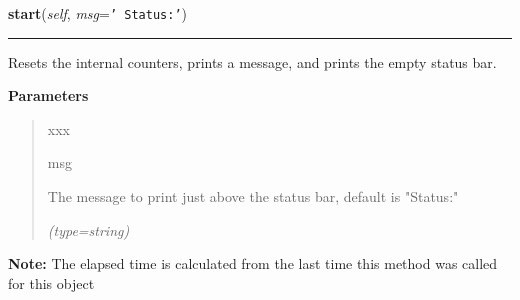     \label{morpher:misc:section_reporter:SectionReporter:start}

    \vspace{0.5ex}

\hspace{.8\funcindent}\begin{boxedminipage}{\funcwidth}

    \raggedright \textbf{start}(\textit{self}, \textit{msg}={\tt \texttt{'}\texttt{  Status:}\texttt{'}})

    \vspace{-1.5ex}

    \rule{\textwidth}{0.5\fboxrule}
\setlength{\parskip}{2ex}
    Resets the internal counters, prints a message, and prints the empty 
    status bar.

\setlength{\parskip}{1ex}
      \textbf{Parameters}
      \vspace{-1ex}

      \begin{quote}
        \begin{Ventry}{xxx}

          \item[msg]

          The message to print just above the status bar, default is 
          "Status:"

            {\it (type=string)}

        \end{Ventry}

      \end{quote}

\textbf{Note:} The elapsed time is calculated from the last time this method was called 
for this object



    \end{boxedminipage}

    \label{morpher:misc:section_reporter:SectionReporter:startSection}

    \vspace{0.5ex}

